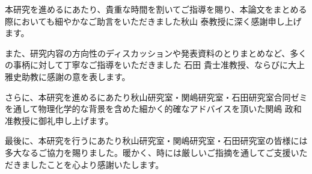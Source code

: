 \begin{syaji}
本研究を進めるにあたり、貴重な時間を割いてご指導を賜り、本論文をまとめる際においても細やかなご助言をいただきました秋山 泰教授に深く感謝申し上げます。

また、研究内容の方向性のディスカッションや発表資料のとりまとめなど、多くの事柄に対して丁寧なご指導をいただきました
石田 貴士准教授、ならびに大上 雅史助教に感謝の意を表します。

さらに、本研究を進めるにあたり秋山研究室・関嶋研究室・石田研究室合同ゼミを通して物理化学的な背景を含めた細かく的確なアドバイスを頂いた関嶋 政和准教授に御礼申し上げます。

最後に、本研究を行うにあたり秋山研究室・関嶋研究室・石田研究室の皆様には多大なるご協力を賜りました。暖かく、時には厳しいご指摘を通してご支援いただきましたことを心より感謝いたします。


\end{syaji}
